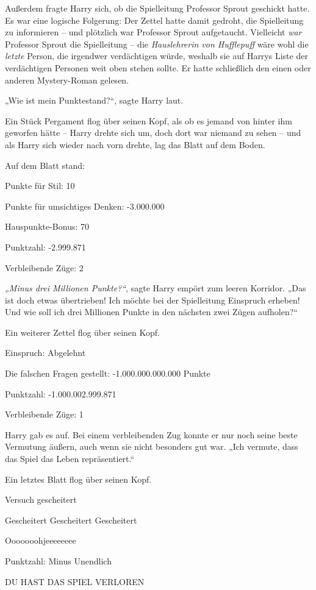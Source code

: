 {Außerdem fragte Harry sich, ob die Spielleitung Professor Sprout geschickt hatte. Es war eine logische Folgerung: Der Zettel hatte damit gedroht, die Spielleitung zu informieren -- und plötzlich war Professor Sprout aufgetaucht. Vielleicht \emph{war} Professor Sprout die Spielleitung -- die \emph{Hauslehrerin von Hufflepuff} wäre wohl die \emph{letzte} Person, die irgendwer verdächtigen würde, weshalb sie auf Harrys Liste der verdächtigen Personen weit oben stehen sollte. Er hatte schließlich den einen oder anderen Mystery-Roman gelesen.

„Wie ist mein Punktestand?“, sagte Harry laut.

Ein Stück Pergament flog über seinen Kopf, als ob es jemand von hinter ihm geworfen hätte -- Harry drehte sich um, doch dort war niemand zu sehen -- und als Harry sich wieder nach vorn drehte, lag das Blatt auf dem Boden.

Auf dem Blatt stand:

Punkte für Stil: 10

Punkte für umsichtiges Denken: -3.000.000

Hauspunkte-Bonus: 70

Punktzahl: -2.999.871

Verbleibende Züge: 2

\emph{„Minus drei Millionen Punkte?“}, sagte Harry empört zum leeren Korridor. „Das ist doch etwas übertrieben! Ich möchte bei der Spielleitung Einspruch erheben! Und wie soll ich drei Millionen Punkte in den nächsten zwei Zügen aufholen?“

Ein weiterer Zettel flog über seinen Kopf.

Einspruch: Abgelehnt

Die falschen Fragen gestellt: -1.000.000.000.000 Punkte

Punktzahl: -1.000.002.999.871

Verbleibende Züge: 1

Harry gab es auf. Bei einem verbleibenden Zug konnte er nur noch seine beste Vermutung äußern, auch wenn sie nicht besonders gut war. „Ich vermute, dass das Spiel das Leben repräsentiert.“

Ein letztes Blatt flog über seinen Kopf.

Versuch gescheitert

Gescheitert Gescheitert Gescheitert

Ooooooohjeeeeeeee

Punktzahl: Minus Unendlich

DU HAST DAS SPIEL VERLOREN

}
